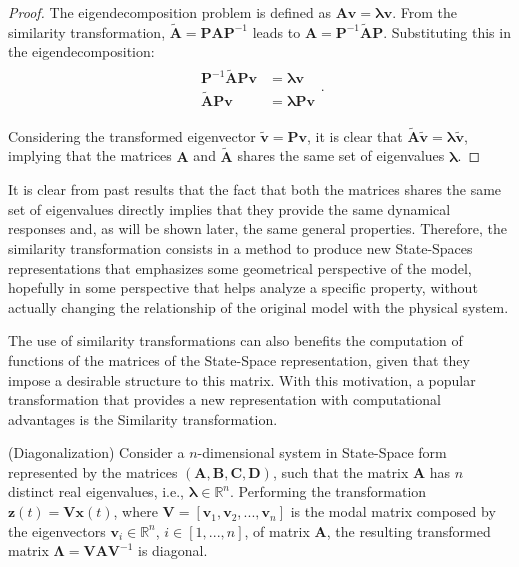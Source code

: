 \documentclass[a4paper,11pt]{book}
\numberwithin{figure}{chapter}
\numberwithin{equation}{chapter}
\numberwithin{table}{chapter}
\newtheorem{theorem}{Theorem}[chapter]
\theoremstyle{definition}
\newcounter{boxed-theorem}
\newenvironment{boxed-theorem}[1]
{\colorlet{shadecolor}{pastelBlue2!10} \begin{shaded} \begin{theorem}{#1}}
{\end{theorem} \end{shaded}}
\newcounter{boxed-definition}
\newcounter{boxed-example}
\begin{document}
\begin{proof}
    The eigendecomposition problem is defined as $\bm{A} \bm{v} = \bm{\lambda} \bm{v}$. From the similarity transformation, $\tilde{\bm{A}} = \bm{P} \bm{A} \bm{P}^{-1}$ leads to $\bm{A} = \bm{P}^{-1} \tilde{\bm{A}} \bm{P}$. Substituting this in the eigendecomposition:
    \begin{align}
    \begin{split}
        \bm{P}^{-1} \tilde{\bm{A}} \bm{P} \bm{v} & = \bm{\lambda} \bm{v} \\
        \tilde{\bm{A}} \bm{P} \bm{v} & =  \bm{\lambda} \bm{P} \bm{v}
    \end{split}
    .\end{align}
   
    Considering the transformed eigenvector $\tilde{\bm{v}} = \bm{P} \bm{v}$, it is clear that $\tilde{\bm{A}} \tilde{\bm{v}} = \bm{\lambda} \tilde{\bm{v}}$, implying that the matrices $\bm{A}$ and $\tilde{\bm{A}}$ shares the same set of eigenvalues $\bm{\lambda}$.
\end{proof}

It is clear from past results that the fact that both the matrices shares the same set of eigenvalues directly implies that they provide the same dynamical responses and, as will be shown later, the same general properties. Therefore, the similarity transformation consists in a method to produce new State-Spaces representations that emphasizes some geometrical perspective of the model, hopefully in some perspective that helps analyze a specific property, without actually changing the relationship of the original model with the physical system.

The use of similarity transformations can also benefits the computation of functions of the matrices of the State-Space representation, given that they impose a desirable structure to this matrix. With this motivation, a popular transformation that provides a new representation with computational advantages is the Similarity transformation.

\begin{boxed-theorem}{(Diagonalization)}
    Consider a $n$-dimensional system in State-Space form represented by the matrices $(\bm{A}, \bm{B}, \bm{C}, \bm{D})$, such that the matrix $\bm{A}$ has $n$ distinct real eigenvalues, i.e., $\bm{\lambda} \in \mathbb{R}^n$. Performing the transformation $\bm{z}(t) = \bm{V} \bm{x}(t)$, where $\bm{V} = [\bm{v}_1, \bm{v}_2, ..., \bm{v}_n]$ is the modal matrix composed by the eigenvectors $\bm{v}_i \in \mathbb{R}^n$, $i \in [1, ..., n]$, of matrix $\bm{A}$, the resulting transformed matrix $\bm{\Lambda} = \bm{V} \bm{A} \bm{V}^{-1}$ is diagonal.
\end{boxed-theorem} 
\end{document}
